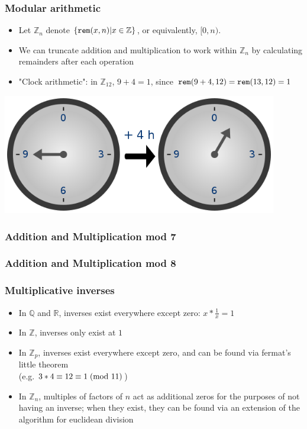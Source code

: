 \documentclass[aspectratio=169]{beamer}
\begin{document}
\begin{frame}[fragile]
\frametitle{Modular arithmetic}
\begin{itemize}
\item Let $\mathbb Z_n$ denote $\{ \verb|rem|(x, n) | x \in \mathbb Z \}$, or equivalently, $[0, n)$.
\item We can truncate addition and multiplication to work within $\mathbb Z_n$ by calculating remainders after each operation
\item {\scriptsize "Clock arithmetic": in $\mathbb Z_{12}$, $9 + 4 = 1$, since $\verb|rem|(9+4, 12) = \verb|rem|(13, 12) = 1$}
\end{itemize}
\includegraphics[width=0.9\textwidth]{diagrams/560px-Clock_group.png}\\
\end{frame}

\begin{frame}[fragile]
\frametitle{Addition and Multiplication mod 7}
\hspace{0.5cm}
\end{frame}

\begin{frame}[fragile]
\frametitle{Addition and Multiplication mod 8}
\hspace{0.5cm}
\end{frame}

\begin{frame}[fragile]
\frametitle{Multiplicative inverses}
\begin{itemize}
\item In $\mathbb Q$ and $\mathbb R$, inverses exist everywhere except zero: $x * \frac{1}{x} = 1$
\item In $\mathbb Z$, inverses only exist at $1$
\item In $\mathbb Z_p$, inverses exist everywhere except zero, and can be found via fermat's little theorem\\ (e.g. $3*4 \equiv 12 \equiv 1\hspace{1mm}(\text{mod }11)$)
\item In $\mathbb Z_n$, multiples of factors of $n$ act as additional zeros for the purposes of not having an inverse; when they exist, they can be found via an extension of the algorithm for euclidean division
\end{itemize}
\end{frame}
\end{document}
